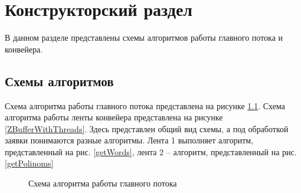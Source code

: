 \chapter{Конструкторский раздел}
В данном разделе представлены схемы алгоритмов работы главного потока и конвейера.

\section{Схемы алгоритмов}
Схема алгоритма работы главного потока представлена  на рисунке \ref{ZBufferAlg}.
Схема алгоритма работы ленты конвейера представлена  на рисунке \ref{ZBufferWithThreads}. Здесь представлен общий вид схемы, а под обработкой заявки понимаются разные алгоритмы. Лента 1 выполняет алгоритм, представленный на рис. \ref{getWords}, лента 2 -- алгоритм, представленный на рис. \ref{getPolinoms}%

\begin{figure}
	\caption{Схема алгоритма работы главного потока}
	\label{ZBufferAlg}
\end{figure}

